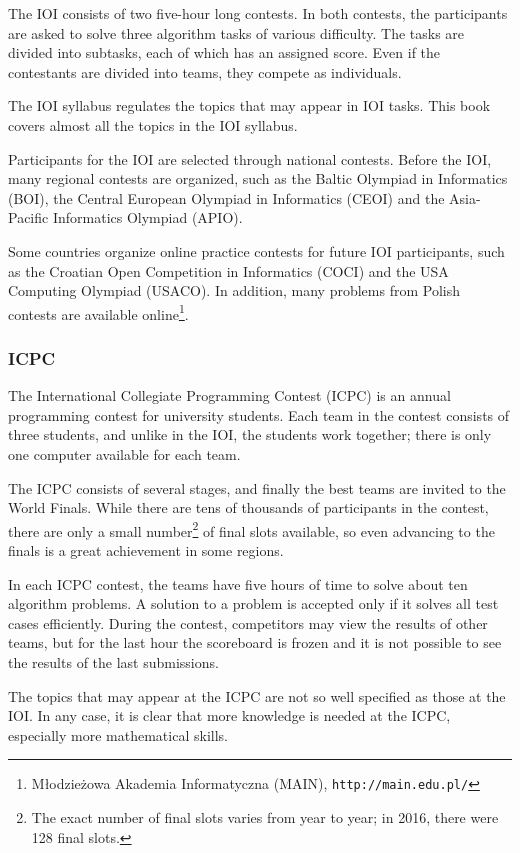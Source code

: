 The IOI consists of two five-hour long contests.
In both contests, the participants are asked to
solve three algorithm tasks of various difficulty.
The tasks are divided into subtasks,
each of which has an assigned score.
Even if the contestants are divided into teams,
they compete as individuals.

The IOI syllabus \cite{iois} regulates the topics
that may appear in IOI tasks.
This book covers almost all the topics in the IOI syllabus.

Participants for the IOI are selected through
national contests.
Before the IOI, many regional contests are organized,
such as the Baltic Olympiad in Informatics (BOI),
the Central European Olympiad in Informatics (CEOI)
and the Asia-Pacific Informatics Olympiad (APIO).

Some countries organize online practice contests
for future IOI participants,
such as the Croatian Open Competition in Informatics (COCI)
and the USA Computing Olympiad (USACO).
In addition,
many problems from Polish contests
are available online\footnote{Młodzieżowa Akademia Informatyczna (MAIN), \texttt{http://main.edu.pl/}}.

\subsubsection{ICPC}

The International Collegiate Programming Contest (ICPC)
is an annual programming contest for university students.
Each team in the contest consists of three students,
and unlike in the IOI, the students work together;
there is only one computer available for each team.

The ICPC consists of several stages, and finally the
best teams are invited to the World Finals.
While there are tens of thousands of participants
in the contest, there are only a small number\footnote{The exact number of final
slots varies from year to year; in 2016, there were 128 final slots.} of final slots available,
so even advancing to the finals
is a great achievement in some regions.

In each ICPC contest, the teams have five hours of time to
solve about ten algorithm problems.
A solution to a problem is accepted only if it solves
all test cases efficiently.
During the contest, competitors may view the results of other teams,
but for the last hour the scoreboard is frozen and it
is not possible to see the results of the last submissions.

The topics that may appear at the ICPC are not so well
specified as those at the IOI.
In any case, it is clear that more knowledge is needed
at the ICPC, especially more mathematical skills.


